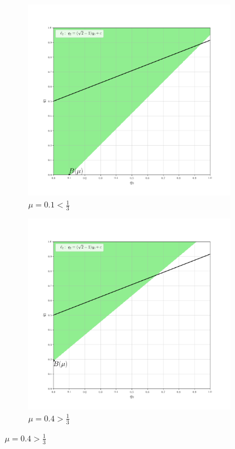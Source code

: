 \begin{flushleft}
	\begin{figure}[H]
    	\centering
     	\begin{subfigure}[b]{0.4 \textwidth}
        	\centering
        	\includegraphics[width=\textwidth]{images/graf_3_3}
        	\caption{$\mu=0.1 < \frac{1}{3}$}
         	\label{fig:y equals x}
     	\end{subfigure}
     	\hspace{10mm}
     	\begin{subfigure}[b]{0.4 \textwidth}
        	\centering
        	\includegraphics[width=\textwidth]{images/graf_3_4}
        	\caption{$\mu=0.4 > \frac{1}{3}$}
        	\label{fig:three sin x}
     	\end{subfigure}
	\end{figure}	


\end{flushleft}
